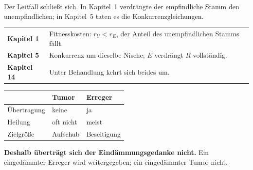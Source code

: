 \begin{merksatz}
Der Leitfall schließt sich. In Kapitel~1 verdrängte der empfindliche Stamm den unempfindlichen; in Kapitel~5 taten es die Konkurrenzgleichungen.

\begin{center}
{\small
\renewcommand{\arraystretch}{1.5}
\begin{tabular}{@{}P{2.4cm}P{6.2cm}@{}}
\toprule
\textbf{Kapitel 1} & Fitnesskosten: $r_U < r_E$, der Anteil des unempfindlichen Stamms fällt.\\
\textbf{Kapitel 5} & Konkurrenz um dieselbe Nische; $E$ verdrängt $R$ vollständig.\\
\textbf{Kapitel 14} & Unter Behandlung kehrt sich beides um.\\
\bottomrule
\end{tabular}}
\end{center}

\begin{center}
{\small
\renewcommand{\arraystretch}{1.5}
\begin{tabular}{@{}P{2.2cm}P{2.8cm}P{3.2cm}@{}}
\toprule
& \textbf{Tumor} & \textbf{Erreger}\\
\midrule
Übertragung & \textcolor{gruen}{keine} & \textcolor{akzent}{ja}\\
Heilung & oft nicht & \textcolor{gruen}{meist}\\
Zielgröße & Aufschub & \textcolor{gruen}{Beseitigung}\\
\bottomrule
\end{tabular}}
\end{center}

\begin{center}
\begin{minipage}{0.9\textwidth}
\textbf{Deshalb überträgt sich der Eindämmungsgedanke nicht.} Ein eingedämmter Erreger wird weitergegeben; ein eingedämmter Tumor nicht.
\end{minipage}
\end{center}

\begin{center}
\begin{minipage}{0.88\textwidth}
\end{minipage}
\end{center}


\end{merksatz}

